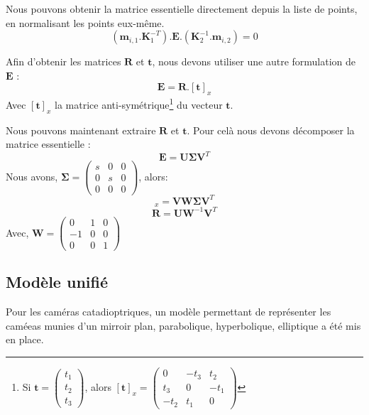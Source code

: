Nous pouvons obtenir la matrice essentielle directement depuis la liste de points, en normalisant les points eux-même.
\begin{equation}
(\mathbf{m}_{i,1}.\mathbf{K}_1^{-T}).\mathbf{E}.(\mathbf{K}_2^{-1}.\mathbf{m}_{i,2}) = 0
\label{eq:essentielle}
\end{equation}


Afin d'obtenir les matrices $\mathbf{R}$ et $\mathbf{t}$, nous devons utiliser une autre formulation de $\mathbf{E}$ :
\begin{equation}
\mathbf{E} = \mathbf{R} . [\mathbf{t}]_x
\end{equation}
Avec $[\mathbf{t}]_x$ la matrice anti-symétrique\footnote{Si $\mathbf{t}=\begin{pmatrix}t_1\\t_2\\t_3\end{pmatrix}$, alors $[\mathbf{t}]_x=\begin{pmatrix}0&-t_3&t_2\\t_3&0&-t_1\\-t_2&t_1&0\end{pmatrix}$} du vecteur $\mathbf{t}$.

Nous pouvons maintenant extraire $\mathbf{R}$ et $\mathbf{t}$. Pour celà nous devons décomposer la matrice essentielle :
$$\mathbf{E}=\mathbf{U} \mathbf{\Sigma} \mathbf{V}^T$$
Nous avons, $ \mathbf{\Sigma} = \begin{pmatrix}s&0&0\\0&s&0\\0&0&0\end{pmatrix}$, alors:
\begin{equation}
[\mathbf{t}]_x = \mathbf{V} \mathbf{W} \mathbf{\Sigma} \mathbf{V}^T
\end{equation}
\begin{equation}
\mathbf{R} = \mathbf{U} \mathbf{W}^{-1} \mathbf{V}^T
\end{equation}
Avec, $\mathbf{W}=\begin{pmatrix}0&1&0\\-1&0&0\\0&0&1\end{pmatrix}$




\subsection{Modèle unifié}

Pour les caméras catadioptriques, un modèle permettant de représenter les caméeas munies d'un mirroir plan, parabolique, hyperbolique, elliptique a été mis en place.

